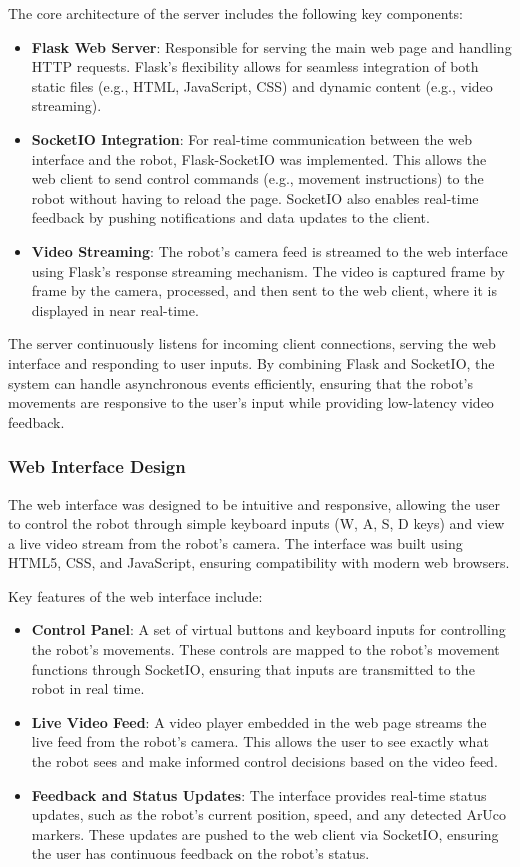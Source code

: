 The core architecture of the server includes the following key components:
\begin{itemize}
	\item \textbf{Flask Web Server}: Responsible for serving the main web page and handling HTTP requests. Flask's flexibility allows for seamless integration of both static files (e.g., HTML, JavaScript, CSS) and dynamic content (e.g., video streaming).
	\item \textbf{SocketIO Integration}: For real-time communication between the web interface and the robot, Flask-SocketIO was implemented. This allows the web client to send control commands (e.g., movement instructions) to the robot without having to reload the page. SocketIO also enables real-time feedback by pushing notifications and data updates to the client.
	\item \textbf{Video Streaming}: The robot’s camera feed is streamed to the web interface using Flask’s response streaming mechanism. The video is captured frame by frame by the camera, processed, and then sent to the web client, where it is displayed in near real-time.

\end{itemize}

The server continuously listens for incoming client connections, serving the web interface and responding to user inputs. By combining Flask and SocketIO, the system can handle asynchronous events efficiently, ensuring that the robot’s movements are responsive to the user’s input while providing low-latency video feedback.

\subsubsection{Web Interface Design}

The web interface was designed to be intuitive and responsive, allowing the user to control the robot through simple keyboard inputs (W, A, S, D keys) and view a live video stream from the robot’s camera. The interface was built using HTML5, CSS, and JavaScript, ensuring compatibility with modern web browsers.

Key features of the web interface include:
\begin{itemize}
	\item \textbf{Control Panel}: A set of virtual buttons and keyboard inputs for controlling the robot’s movements. These controls are mapped to the robot’s movement functions through SocketIO, ensuring that inputs are transmitted to the robot in real time.
	\item \textbf{Live Video Feed}: A video player embedded in the web page streams the live feed from the robot’s camera. This allows the user to see exactly what the robot sees and make informed control decisions based on the video feed.
	\item \textbf{Feedback and Status Updates}: The interface provides real-time status updates, such as the robot’s current position, speed, and any detected ArUco markers. These updates are pushed to the web client via SocketIO, ensuring the user has continuous feedback on the robot’s status.
\end{itemize}

